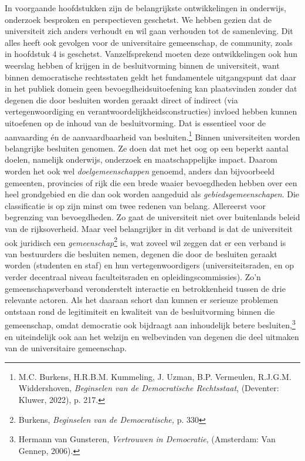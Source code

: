 \documentclass[smallauthor, chapterhaspagenum, nochapterinheader, pagenuminheader,  bigchapnum,medium2, tocpages,  garamond, titleinheader]{jote-book}
\begin{document}
	In voorgaande hoofdstukken zijn de belangrijkste ontwikkelingen in onderwijs, onderzoek besproken en perspectieven geschetst. We hebben gezien dat de universiteit zich anders verhoudt en wil gaan verhouden tot de samenleving. Dit alles heeft ook gevolgen voor de universitaire gemeenschap, de community, zoals in hoofdstuk 4 is geschetst. Vanzelfsprekend moeten deze ontwikkelingen ook hun weerslag hebben of krijgen in de besluitvorming binnen de universiteit, want binnen democratische rechtsstaten geldt het fundamentele uitgangspunt dat daar in het publiek domein geen bevoegdheidsuitoefening kan plaatsvinden zonder dat degenen die door besluiten worden geraakt direct of indirect (via vertegenwoordiging en verantwoordelijkheidsconstructies) invloed hebben kunnen uitoefenen op de inhoud van de besluitvorming. Dat is essentieel voor de aanvaarding én de aanvaardbaarheid van besluiten.\footnote{M.C. Burkens, H.R.B.M. Kummeling, J. Uzman, B.P. Vermeulen, R.J.G.M. Widdershoven, \emph{Beginselen van de Democratische Rechtsstaat}, (Deventer: Kluwer, 2022), p. 217.} Binnen universiteiten worden belangrijke besluiten genomen. Ze doen dat met het oog op een beperkt aantal doelen, namelijk onderwijs, onderzoek en maatschappelijke impact. Daarom worden het ook wel \emph{doelgemeenschappen} genoemd, anders dan bijvoorbeeld gemeenten, provincies of rijk die een brede waaier bevoegdheden hebben over een heel grondgebied en die dan ook worden aangeduid als \emph{gebiedsgemeenschapen}. Die classificatie is op zijn minst om twee redenen van belang. Allereerst voor begrenzing van bevoegdheden. Zo gaat de universiteit niet over buitenlands beleid van de rijksoverheid. Maar veel belangrijker in dit verband is dat de universiteit ook juridisch een \emph{gemeenschap}\footnote{Burkens, \emph{Beginselen van de Democratische,}\emph{ }p. 330}\emph{ }is, wat zoveel wil zeggen dat er een verband is van bestuurders die besluiten nemen, degenen die door de besluiten geraakt worden (studenten en staf) en hun vertegenwoordigers (universiteitsraden, en op verder decentraal niveau faculteitsraden en opleidingscommissies). Zo'n gemeenschapsverband veronderstelt interactie en betrokkenheid tussen de drie relevante actoren. Als het daaraan schort dan kunnen er serieuze problemen ontstaan rond de legitimiteit en kwaliteit van de besluitvorming binnen die gemeenschap, omdat democratie ook bijdraagt aan inhoudelijk betere besluiten,\footnote{Hermann van Gunsteren, \emph{Vertrouwen in Democratie}, (Amsterdam: Van Gennep, 2006).} en uiteindelijk ook aan het welzijn en welbevinden van degenen die deel uitmaken van de universitaire gemeenschap.
\end{document}
